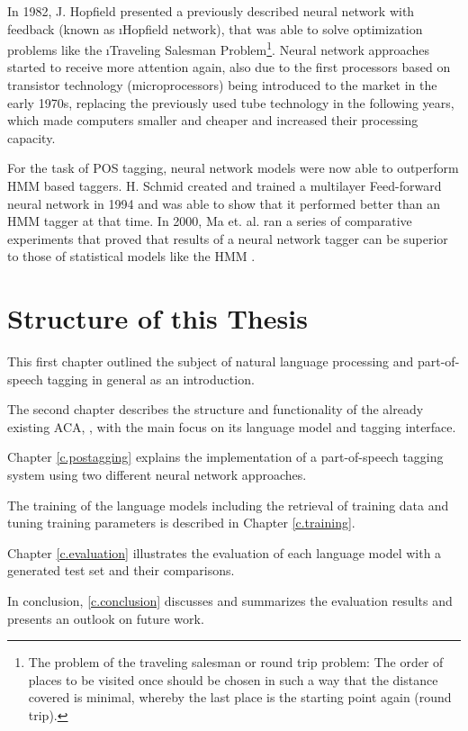 In 1982, J. Hopfield presented a previously described neural network with feedback (known as \i{Hopfield network}), that was able to solve optimization problems like the \i{Traveling Salesman Problem}\footnote{The problem of the traveling salesman or round trip problem: The order of places to be visited once should be chosen in such a way that the distance covered is minimal, whereby the last place is the starting point again (round trip).}. Neural network approaches started to receive more attention again, also due to the first processors based on transistor technology (microprocessors) being introduced to the market in the early 1970s, replacing the previously used tube technology in the following years, which made computers smaller and cheaper and increased their processing capacity.

For the task of POS tagging, neural network models were now able to outperform HMM based taggers. H. Schmid created and trained a multilayer Feed-forward neural network in 1994 and was able to show that it performed better than an HMM tagger \cite{schmid1994} at that time. In 2000, Ma et. al. ran a series of comparative experiments that proved that results of a neural network tagger can be superior to those of statistical models like the HMM \cite{ma2000}.

\section{Structure of this Thesis}\label{c.introduction.structure}
This first chapter outlined the subject of natural language processing and part-of-speech tagging in general as an introduction.

The second chapter describes the structure and functionality of the already existing ACA, \Alex, with the main focus on its language model and tagging interface.

Chapter \ref{c.postagging} explains the implementation of a part-of-speech tagging system using two different neural network approaches.

The training of the language models including the retrieval of training data and tuning training parameters is described in Chapter \ref{c.training}.

Chapter \ref{c.evaluation} illustrates the evaluation of each language model with a generated test set and their comparisons.

In conclusion, \ref{c.conclusion} discusses and summarizes the evaluation results and presents an outlook on future work.

